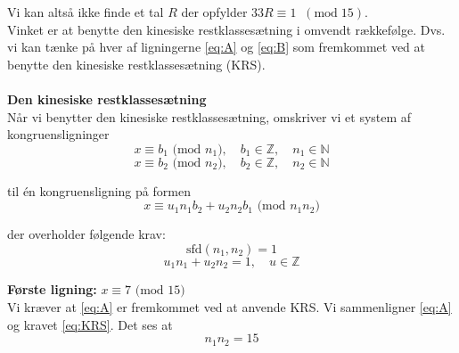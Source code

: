 Vi kan altså ikke finde et tal $R$ der opfylder $33R \equiv 1 \; \; (\text{mod} \; 15)$.\\


Vinket er at benytte den kinesiske restklassesætning i omvendt rækkefølge. Dvs. vi kan tænke på hver af ligningerne \eqref{eq:A} og \eqref{eq:B} som fremkommet ved at benytte den kinesiske restklassesætning (KRS).\\
\\
\textbf{Den kinesiske restklassesætning}\\
Når vi benytter den kinesiske restklassesætning, omskriver vi et system af kongruensligninger
\begin{equation}
x \equiv b_1 \text{  (mod } n_1), \quad b_1 \in \mathbb{Z}, \quad n_1 \in \mathbb{N}
\end{equation}
\vspace{-0.55cm}
\begin{equation}
x \equiv b_2 \text{  (mod } n_2), \quad b_2 \in \mathbb{Z}, \quad n_2 \in \mathbb{N}
\end{equation}

til én kongruensligning på formen
\begin{equation}\label{eq:KRS}
x \equiv u_1 n_1 b_2 + u_2 n_2 b_1 \text{ (mod } n_1 n_2)
\end{equation}

der overholder følgende krav:
\begin{equation}\label{eq:krav1}
\text{sfd}(n_1,n_2) = 1
\end{equation}
\vspace{-0.55cm}
\begin{equation}\label{eq:krav2}
u_1 n_1 + u_2 n_2 = 1, \quad u \in \mathbb{Z}
\end{equation}


\textbf{Første ligning:} $x \equiv 7 \text{ (mod 15)}$\\
Vi kræver at \eqref{eq:A} er fremkommet ved at anvende KRS. Vi sammenligner \eqref{eq:A} og kravet \eqref{eq:KRS}. Det ses at
\begin{equation}\label{eq:n1n2produkt1}
n_1 n_2 = 15
\end{equation}

